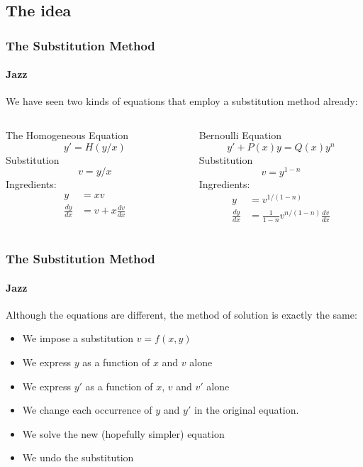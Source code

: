 \documentclass[9pt,xcolor=x11names,compress]{beamer}
\begin{document}
\subsection{The idea}
\begin{frame}\frametitle{The Substitution Method}
    
\framesubtitle{Jazz}
We have seen two kinds of equations that employ a substitution method already:
\begin{columns}[T]
	\begin{column}{0.45\linewidth}
	\alert{The Homogeneous Equation}
	\begin{equation*}
	y'=H(y/x)	
	\end{equation*}
	Substitution 
	\begin{equation*}
	v=y/x
	\end{equation*}
	Ingredients:
	\begin{align*}
		y&=xv \\
		\frac{dy}{dx}&=v+x\frac{dv}{dx}
	\end{align*}
	\end{column}
	\begin{column}{0.45\linewidth}
	\alert{Bernoulli Equation}
	\begin{equation*}
	y'+P(x)y=Q(x)y^n	
	\end{equation*}
	Substitution 
	\begin{equation*}
	v=y^{1-n}
	\end{equation*}
	Ingredients:
	\begin{align*}
		y&=v^{1/(1-n)} \\ 
		\frac{dy}{dx}&=\frac{1}{1-n}v^{n/(1-n)}\frac{dv}{dx}
	\end{align*}
	\end{column}
\end{columns}
\end{frame}

\begin{frame}\frametitle{The Substitution Method}
\framesubtitle{Jazz}
Although the equations are different, the method of solution is exactly the same:
\begin{itemize}[<+-|alert@+>]
	\item We impose a substitution $v=f(x,y)$
	\item We express $y$ as a function of $x$ and $v$ alone
	\item We express $y'$ as a function of $x$, $v$ and $v'$ alone
	\item We change each occurrence of $y$ and $y'$ in the original equation.
	\item We solve the new (hopefully simpler) equation 
	\item We undo the substitution
\end{itemize}
\end{frame}
\end{document}
